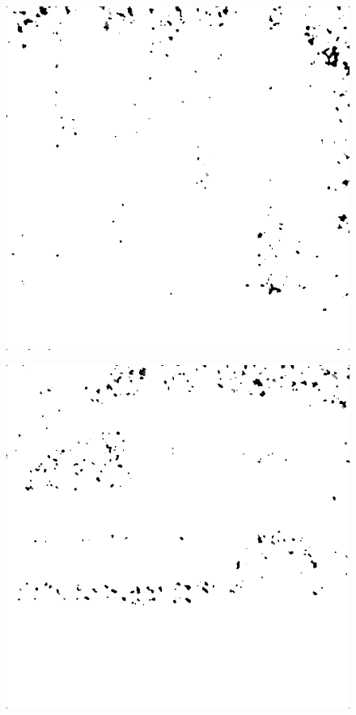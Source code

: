 \begin{figure}[H]
\begin{minipage}[t]{0.3\linewidth}
	\label{fig:hus_m10}
\end{minipage}
\begin{minipage}[t]{0.3\linewidth} %
	\includegraphics[width = 1\linewidth]{gfx/sit/sit_m10.png}
	\label{fig:sit_m10}
\end{minipage}
\begin{minipage}[t]{0.3\linewidth} %
	\includegraphics[width = 1\linewidth]{gfx/car/car_m15.png}

\end{minipage}
\end{figure}
